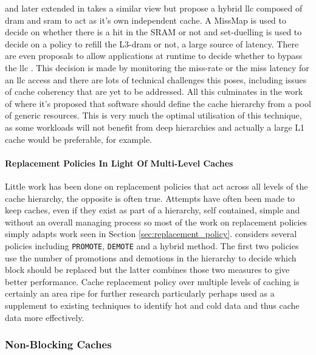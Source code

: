 \citet{hameedAdaptiveCacheManagement2013} and later extended in \citeyear{hameedReducingLatencySRAM2014} \cite{hameedReducingLatencySRAM2014} takes a similar view but propose a hybrid \gls{llc} composed of \gls{dram} and \gls{sram} to act as it's own independent cache. A MissMap \cite{lohEfficientlyEnablingConventional2011} is used to decide on whether there is a hit in the SRAM or not and set-duelling is used to decide on a policy to refill the L3-\gls{dram} or not, a large source of latency. There are even proposals to allow applications at runtime to decide whether to bypass the \gls{llc} \cite{warrierSkipCacheApplicationAware2015}. This decision is made by monitoring the miss-rate or the miss latency for an \gls{llc} access and there are lots of technical challenges this poses, including issues of cache coherency that are yet to be addressed. All this culminates in the work of \citet{tsaiJengaSoftwaredefinedCache2017} where it's proposed that software should define the cache hierarchy from a pool of generic resources. This is very much the optimal utilisation of this technique, as some workloads will not benefit from deep hierarchies and actually a large L1 cache would be preferable, for example. 

\paragraph{Replacement Policies In Light Of Multi-Level Caches}

Little work has been done on replacement policies that act across all levels of the cache hierarchy, the opposite is often true. Attempts have often been made to keep caches, even if they exist as part of a hierarchy, self contained, simple and without an overall managing process so most of the work on replacement policies simply adapts work seen in Section \ref{sec:replacement_policy}. \citet{kelwadeReputationBasedCache2017} considers several policies including \texttt{PROMOTE}, \texttt{DEMOTE} and a hybrid method. The first two policies use the number of promotions and demotions in the hierarchy to decide which block should be replaced but the latter combines those two measures to give better performance. Cache replacement policy over multiple levels of caching is certainly an area ripe for further research particularly perhaps used as a supplement to existing techniques to identify hot and cold data and thus cache data more effectively.

\subsubsection{Non-Blocking Caches}

